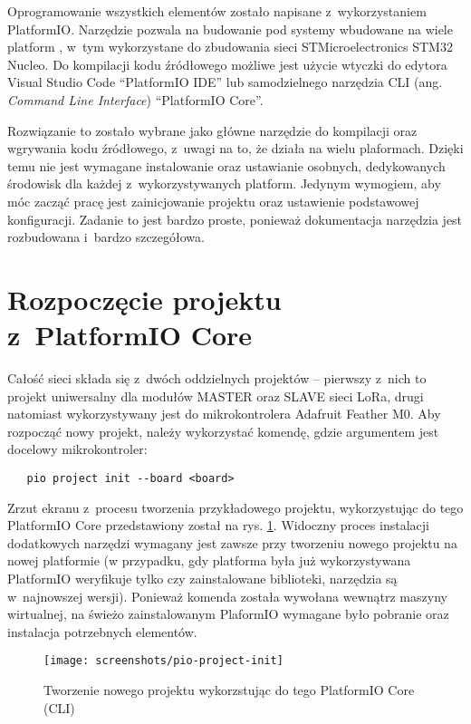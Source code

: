 Oprogramowanie wszystkich elementów zostało napisane z~wykorzystaniem PlatformIO. Narzędzie pozwala na budowanie pod
systemy wbudowane na wiele platform \cite{pio-platforms}, w~tym wykorzystane do zbudowania sieci STMicroelectronics
STM32 Nucleo. Do kompilacji kodu źródłowego możliwe jest użycie wtyczki do edytora Visual Studio Code
\enquote{PlatformIO IDE} lub samodzielnego narzędzia CLI (ang. \textsl{Command Line Interface}) \enquote{PlatformIO
    Core}.

Rozwiązanie to zostało wybrane jako główne narzędzie do kompilacji oraz wgrywania kodu źródłowego, z~uwagi na to, że
działa na wielu plaformach. Dzięki temu nie jest wymagane instalowanie oraz ustawianie osobnych, dedykowanych środowisk
dla każdej z~wykorzystywanych platform. Jedynym wymogiem, aby móc zacząć pracę jest zainicjowanie projektu oraz
ustawienie podstawowej konfiguracji. Zadanie to jest bardzo proste, ponieważ dokumentacja narzędzia jest rozbudowana
i~bardzo szczegółowa.

\section{Rozpoczęcie projektu z~PlatformIO Core\label{sect:pio-intro}} Całość sieci składa się z~dwóch oddzielnych
projektów -- pierwszy z~nich to projekt uniwersalny dla modułów MASTER oraz SLAVE sieci LoRa, drugi natomiast
wykorzystywany jest do mikrokontrolera Adafruit Feather M0. Aby rozpocząć nowy projekt, należy wykorzystać komendę,
gdzie argumentem jest docelowy mikrokontroler:
\begin{verbatim}
   pio project init --board <board>
\end{verbatim}
Zrzut ekranu z~procesu tworzenia przykładowego projektu, wykorzystując do tego PlatformIO Core przedstawiony został na
rys. \ref{img:pio-project-init}. Widoczny proces instalacji dodatkowych narzędzi wymagany jest zawsze przy tworzeniu
nowego projektu na nowej platformie (w przypadku, gdy platforma była już wykorzystywana PlatformIO weryfikuje tylko czy
zainstalowane biblioteki, narzędzia są w~najnowszej wersji). Ponieważ komenda została wywołana wewnątrz maszyny
wirtualnej, na świeżo zainstalowanym PlaformIO wymagane było pobranie oraz instalacja potrzebnych elementów.

\begin{figure}[!htbp]
    \centering
    \texttt{[image: screenshots/pio-project-init]}
    \caption{\label{img:pio-project-init}Tworzenie nowego projektu wykorzstując do tego PlatformIO Core (CLI)}
\end{figure}

